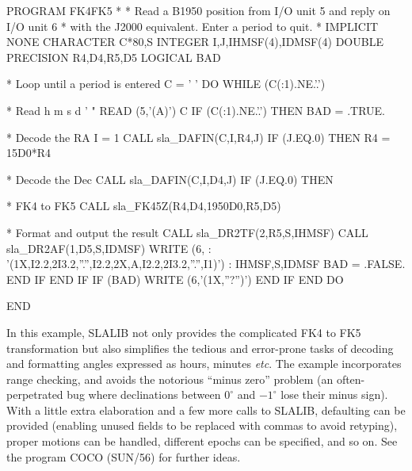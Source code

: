 \documentclass[11pt,twoside,nolof]{starlink}
\begin{document}
\begin{terminalv}
         PROGRAM FK4FK5
   *
   *  Read a B1950 position from I/O unit 5 and reply on I/O unit 6
   *  with the J2000 equivalent.  Enter a period to quit.
   *
         IMPLICIT NONE
         CHARACTER C*80,S
         INTEGER I,J,IHMSF(4),IDMSF(4)
         DOUBLE PRECISION R4,D4,R5,D5
         LOGICAL BAD

   *   Loop until a period is entered
         C = ' '
         DO WHILE (C(:1).NE.'.')

   *     Read h m s d ' "
            READ (5,'(A)') C
            IF (C(:1).NE.'.') THEN
               BAD = .TRUE.

   *        Decode the RA
               I = 1
               CALL sla_DAFIN(C,I,R4,J)
               IF (J.EQ.0) THEN
                  R4 = 15D0*R4

   *           Decode the Dec
                  CALL sla_DAFIN(C,I,D4,J)
                  IF (J.EQ.0) THEN

   *              FK4 to FK5
                     CALL sla_FK45Z(R4,D4,1950D0,R5,D5)

   *              Format and output the result
                     CALL sla_DR2TF(2,R5,S,IHMSF)
                     CALL sla_DR2AF(1,D5,S,IDMSF)
                     WRITE (6,
        :       '(1X,I2.2,2I3.2,''.'',I2.2,2X,A,I2.2,2I3.2,''.'',I1)')
        :                                                     IHMSF,S,IDMSF
                     BAD = .FALSE.
                  END IF
               END IF
               IF (BAD) WRITE (6,'(1X,''?'')')
            END IF
         END DO

         END
\end{terminalv}
In this example, SLALIB not only provides the complicated FK4 to
FK5 transformation but also
simplifies the tedious and error-prone tasks
of decoding and formatting angles
expressed as hours, minutes \textit{etc}.  The
example incorporates range checking, and avoids the
notorious ``minus zero'' problem (an often-perpetrated bug where
declinations between $0^{\circ}$ and $-1^{\circ}$ lose their minus
sign).
With a little extra elaboration and a few more calls to SLALIB,
defaulting can be provided (enabling unused fields to
be replaced with commas to avoid retyping), proper motions
can be handled, different epochs can be specified, and
so on.  See the program COCO (SUN/56) for further ideas.
\end{document}
